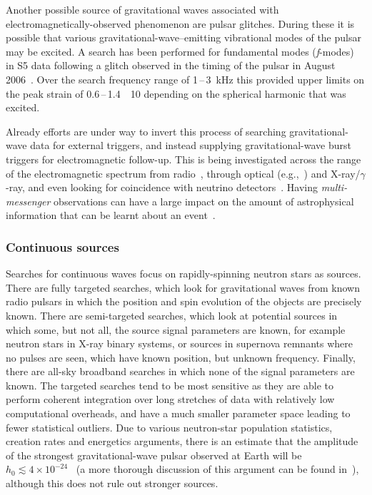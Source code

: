 \documentclass{article}
\begin{document}
Another possible source of gravitational waves associated with
electromagnetically-observed phenomenon are pulsar glitches. During these it is
possible that various gravitational-wave--emitting vibrational modes of the
pulsar may be excited. A search has been performed for fundamental modes
(\textit{f}-modes) in S5 data following a glitch observed in the
timing of the  pulsar in August
2006~\cite{Abadie:2010a}. Over the search frequency range of
1\,--\,3~kHz this provided upper limits on the peak strain of
0.6\,--\,1.4~\texttimes~10 depending on the spherical
harmonic that was excited. 

Already efforts are under way to invert this process of searching gravitational-wave data for external triggers, and instead supplying gravitational-wave burst
triggers for electromagnetic follow-up. This is being investigated across the
range of the electromagnetic spectrum from radio~\cite{Predoi:2010}, through
optical (e.g.,~\cite{Kanner:2008, Coward:2010}) and X-ray/$\gamma$-ray, and even
looking for coincidence with neutrino detectors~\cite{Aso:2008, Pradier:2010,
Chassande:2010}. Having \textit{multi-messenger} observations can have a
large impact on the amount of astrophysical information that can be learnt about
an event~\cite{Phinney:2009}.

\subsubsection{Continuous sources}

Searches for continuous waves focus on rapidly-spinning neutron stars as
sources. There are fully targeted searches, which look for gravitational waves
from known radio pulsars in which the position and spin evolution of the objects
are precisely known. There are semi-targeted searches, which look at potential
sources in which some, but not all, the source signal parameters are known, for
example neutron stars in X-ray binary systems, or sources in supernova remnants
where no pulses are seen, which have known position, but unknown frequency.
Finally, there are all-sky broadband searches in which none of the signal
parameters are known. The targeted searches tend to be most sensitive as they
are able to perform coherent integration over long stretches of data with
relatively low computational overheads, and have a much smaller parameter space
leading to fewer statistical outliers. Due to various neutron-star population
statistics, creation rates and energetics arguments, there is an estimate that
the amplitude of the strongest gravitational-wave pulsar observed at Earth will
be $h_0 \lesssim 4\times10^{-24}$~\cite{Abbott:2007a} (a more thorough
discussion of this argument can be found in~\cite{Knispel:2008}), although this
does not rule out stronger sources.
\end{document}
